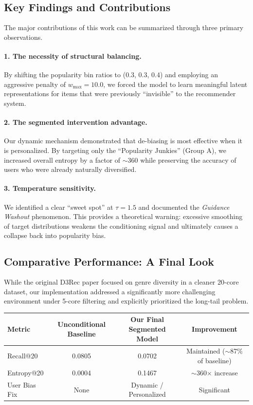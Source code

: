\documentclass[11pt,a4paper]{article}
\begin{document}
\subsection{Key Findings and Contributions}
The major contributions of this work can be summarized through three primary observations.

\paragraph{1. The necessity of structural balancing.}
By shifting the popularity bin ratios to (0.3, 0.3, 0.4) and employing an aggressive penalty of $w_{\max}=10.0$, we forced the model to learn meaningful latent representations for items that were previously ``invisible'' to the recommender system.

\paragraph{2. The segmented intervention advantage.}
Our dynamic mechanism demonstrated that de-biasing is most effective when it is personalized. By targeting only the ``Popularity Junkies'' (Group A), we increased overall entropy by a factor of $\sim$360 while preserving the accuracy of users who were already naturally diversified.

\paragraph{3. Temperature sensitivity.}
We identified a clear ``sweet spot'' at $\tau=1.5$ and documented the \emph{Guidance Washout} phenomenon. This provides a theoretical warning: excessive smoothing of target distributions weakens the conditioning signal and ultimately causes a collapse back into popularity bias.

\subsection{Comparative Performance: A Final Look}
While the original D3Rec paper focused on genre diversity in a cleaner 20-core dataset, our implementation addressed a significantly more challenging environment under 5-core filtering and explicitly prioritized the long-tail problem.

\begin{center}
\begin{tabular}{lccc}
\hline
\textbf{Metric} &
\textbf{Unconditional Baseline} &
\textbf{Our Final Segmented Model} &
\textbf{Improvement} \\
\hline
Recall@20 & 0.0805 & 0.0702 & Maintained ($\sim$87\% of baseline) \\
Entropy@20 & 0.0004 & 0.1467 & $\sim$360$\times$ increase \\
User Bias Fix & None & Dynamic / Personalized & Significant \\
\hline
\end{tabular}
\end{center}
\end{document}
